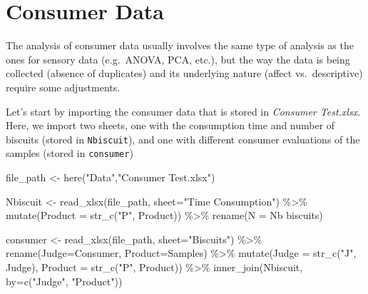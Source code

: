 \documentclass[
]{book}
\newenvironment{Shaded}{\begin{snugshade}}{\end{snugshade}}
\newcommand{\AttributeTok}[1]{\textcolor[rgb]{0.77,0.63,0.00}{#1}}
\newcommand{\FunctionTok}[1]{\textcolor[rgb]{0.00,0.00,0.00}{#1}}
\newcommand{\NormalTok}[1]{#1}
\newcommand{\OtherTok}[1]{\textcolor[rgb]{0.56,0.35,0.01}{#1}}
\newcommand{\SpecialCharTok}[1]{\textcolor[rgb]{0.00,0.00,0.00}{#1}}
\newcommand{\StringTok}[1]{\textcolor[rgb]{0.31,0.60,0.02}{#1}}
\begin{document}
\hypertarget{consumer-data}{%
\section{Consumer Data}\label{consumer-data}}

The analysis of consumer data usually involves the same type of analysis as the ones for sensory data (e.g.~ANOVA, PCA, etc.), but the way the data is being collected (absence of duplicates) and its underlying nature (affect vs.~descriptive) require some adjustments.

Let's start by importing the consumer data that is stored in \emph{Consumer Test.xlsx}. Here, we import two sheets, one with the consumption time and number of biscuits (stored in \texttt{Nbiscuit}), and one with different consumer evaluations of the samples (stored in \texttt{consumer})

\begin{Shaded}
\begin{Highlighting}[]
\NormalTok{file\_path }\OtherTok{\textless{}{-}} \FunctionTok{here}\NormalTok{(}\StringTok{"Data"}\NormalTok{,}\StringTok{"Consumer Test.xlsx"}\NormalTok{)}

\NormalTok{Nbiscuit }\OtherTok{\textless{}{-}} \FunctionTok{read\_xlsx}\NormalTok{(file\_path, }\AttributeTok{sheet=}\StringTok{"Time Consumption"}\NormalTok{) }\SpecialCharTok{\%\textgreater{}\%} 
  \FunctionTok{mutate}\NormalTok{(}\AttributeTok{Product =} \FunctionTok{str\_c}\NormalTok{(}\StringTok{"P"}\NormalTok{, Product)) }\SpecialCharTok{\%\textgreater{}\%} 
  \FunctionTok{rename}\NormalTok{(}\AttributeTok{N =} \StringTok{\textasciigrave{}}\AttributeTok{Nb biscuits}\StringTok{\textasciigrave{}}\NormalTok{)}

\NormalTok{consumer }\OtherTok{\textless{}{-}} \FunctionTok{read\_xlsx}\NormalTok{(file\_path, }\AttributeTok{sheet=}\StringTok{"Biscuits"}\NormalTok{) }\SpecialCharTok{\%\textgreater{}\%} 
  \FunctionTok{rename}\NormalTok{(}\AttributeTok{Judge=}\NormalTok{Consumer, }\AttributeTok{Product=}\NormalTok{Samples) }\SpecialCharTok{\%\textgreater{}\%} 
  \FunctionTok{mutate}\NormalTok{(}\AttributeTok{Judge =} \FunctionTok{str\_c}\NormalTok{(}\StringTok{"J"}\NormalTok{, Judge), }\AttributeTok{Product =} \FunctionTok{str\_c}\NormalTok{(}\StringTok{"P"}\NormalTok{, Product)) }\SpecialCharTok{\%\textgreater{}\%} 
  \FunctionTok{inner\_join}\NormalTok{(Nbiscuit, }\AttributeTok{by=}\FunctionTok{c}\NormalTok{(}\StringTok{"Judge"}\NormalTok{, }\StringTok{"Product"}\NormalTok{))}
\end{Highlighting}
\end{Shaded}
\end{document}
